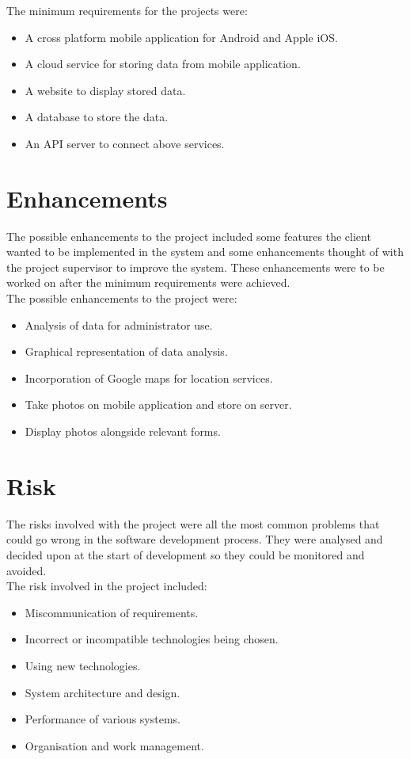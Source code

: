 The minimum requirements for the projects were:

\begin{itemize}
\item A cross platform mobile application for Android and Apple iOS.
\item A cloud service for storing data from mobile application.
\item A website to display stored data.
\item A database to store the data.
\item An API server to connect above services.
\end{itemize}

\section{Enhancements}
The possible enhancements to the project included some features the client wanted to be implemented in the system and some enhancements thought of with the project supervisor to improve the system. These enhancements were to be worked on after the minimum requirements were achieved. \\ 

The possible enhancements to the project were:
\begin{itemize}
\item Analysis of data for administrator use.
\item Graphical representation of data analysis.
\item Incorporation of Google maps for location services.
\item Take photos on mobile application and store on server.
\item Display photos alongside relevant forms.
\end{itemize}


\section{Risk}
The risks involved with the project were all the most common problems that could go wrong in the software development process. They were analysed and decided upon at the start of development so they could be monitored and avoided. \\

The risk involved in the project included:

\begin{itemize}
\item Miscommunication of requirements.
\item Incorrect or incompatible technologies being chosen.
\item Using new technologies.
\item System architecture and design.
\item Performance of various systems.
\item Organisation and work management.
\end{itemize}

